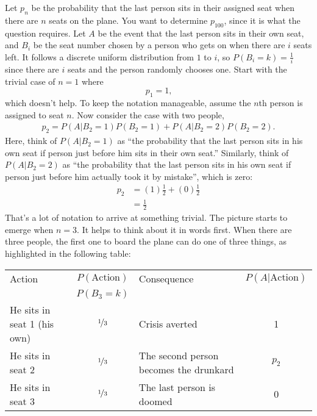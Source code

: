 \documentclass[a4paper]{article}
\begin{document}
Let $p_n$ be the probability that the last person sits in their assigned seat when there are $n$ seats on the plane.
You want to determine $p_{100}$, since it is what the question requires.
Let $A$ be the event that the last person sits in their own seat, and $B_i$ be the seat number chosen by a person who gets on when there are $i$ seats left.
It follows a discrete uniform distribution from $1$ to $i$, so $P(B_i = k) = \frac{1}{i}$ since there are $i$ seats and the person randomly chooses one.
Start with the trivial case of $n=1$ where
\[
  p_1 = 1
  \text{,}
\]
which doesn't help.
To keep the notation manageable, assume the $n$th person is assigned to seat $n$.
Now consider the case with two people,
\begin{align*}
  p_2 = P(A|B_2 = 1)P(B_2=1) + P(A|B_2 = 2)P(B_2=2)
  \text{.}
\end{align*}
Here, think of  $P(A|B_2 = 1)$ as ``the probability that the last person sits in his own seat if person just before him sits in their own seat.''
Similarly, think of  $P(A|B_2 = 2)$ as ``the probability that the last person sits in his own seat if person just before him actually took it by mistake'', which is zero:
\begin{align*}
  p_2 &= (1)\frac{1}{2} + (0)\frac{1}{2} \\
  &= \frac{1}{2}
\end{align*}
That's a lot of notation to arrive at something trivial.
The picture starts to emerge when $n=3$.
It helps to think about it in words first.
When there are three people, the first one to board the plane can do one of three things, as highlighted in the following table:
\begin{center}
\begin{tabular}{lclc}
\hline
 Action                    & $P(\text{Action})$ &  Consequence                             & $P(A|\text{Action})$ \\
                           & $P(B_3 = k)$       &                                          &               \\
 \hline
He sits in seat 1 (his own)& $\nicefrac{1}{3}$  &  Crisis averted                          & 1\\
He sits in seat 2          & $\nicefrac{1}{3}$  &  The second person becomes the drunkard  & $p_2$\\
He sits in seat 3          & $\nicefrac{1}{3}$  &  The last person is doomed               & 0\\
\hline
\end{tabular}
\end{center}
\end{document}
